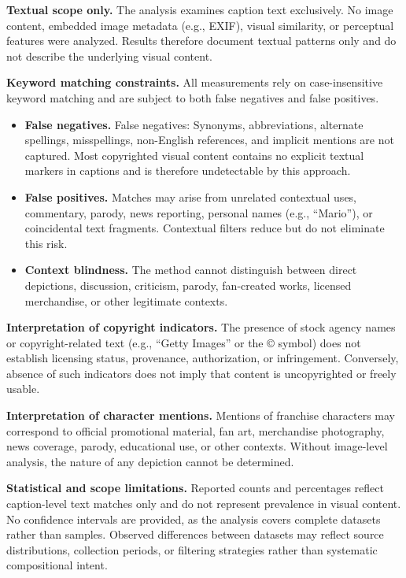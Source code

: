 \documentclass[11pt]{article}
\begin{document}
\textbf{Textual scope only.} The analysis examines caption text exclusively. No image content, embedded image metadata (e.g., EXIF), visual similarity, or perceptual features were analyzed. Results therefore document textual patterns only and do not describe the underlying visual content.

\textbf{Keyword matching constraints.} All measurements rely on case-insensitive keyword matching and are subject to both false negatives and false positives.
\begin{itemize}
\item \textbf{False negatives.} False negatives: Synonyms, abbreviations, alternate spellings, misspellings, non-English references, and implicit mentions are not captured. Most copyrighted visual content contains no explicit textual markers in captions and is therefore undetectable by this approach.
\item \textbf{False positives.} Matches may arise from unrelated contextual uses, commentary, parody, news reporting, personal names (e.g., “Mario”), or coincidental text fragments. Contextual filters reduce but do not eliminate this risk.
\item \textbf{Context blindness.} The method cannot distinguish between direct depictions, discussion, criticism, parody, fan-created works, licensed merchandise, or other legitimate contexts.
\end{itemize}

\textbf{Interpretation of copyright indicators.}
The presence of stock agency names or copyright-related text (e.g., “Getty Images” or the © symbol) does not establish licensing status, provenance, authorization, or infringement. Conversely, absence of such indicators does not imply that content is uncopyrighted or freely usable.


\textbf{Interpretation of character mentions.}
Mentions of franchise characters may correspond to official promotional material, fan art, merchandise photography, news coverage, parody, educational use, or other contexts. Without image-level analysis, the nature of any depiction cannot be determined.

\textbf{Statistical and scope limitations.}
Reported counts and percentages reflect caption-level text matches only and do not represent prevalence in visual content. No confidence intervals are provided, as the analysis covers complete datasets rather than samples. Observed differences between datasets may reflect source distributions, collection periods, or filtering strategies rather than systematic compositional intent.
\end{document}
